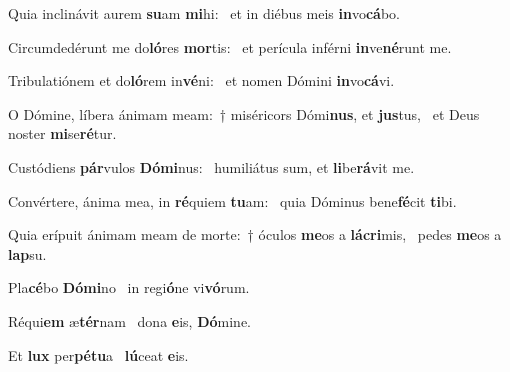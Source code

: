 \item Quia inclinávit aurem \textbf{su}am \textbf{mi}hi:~\psstar{} et in diébus meis \textbf{in}vo\textbf{cá}bo.

\item Circumdedérunt me do\textbf{ló}res \textbf{mor}tis:~\psstar{} et perícula inférni \textbf{in}ve\textbf{né}runt me.

\item Tribulatiónem et do\textbf{ló}rem in\textbf{vé}ni:~\psstar{} et nomen Dómini \textbf{in}vo\textbf{cá}vi.

\item O Dómine, líbera ánimam meam:~† miséricors Dómi\textbf{nus}, et \textbf{jus}tus,~\psstar{} et Deus noster \textbf{mi}se\textbf{ré}tur.

\item Custódiens \textbf{pár}vulos \textbf{Dó}\textbf{mi}nus:~\psstar{} humiliátus sum, et \textbf{li}be\textbf{rá}vit me.

\item Convértere, ánima mea, in \textbf{ré}quiem \textbf{tu}am:~\psstar{} quia Dóminus bene\textbf{fé}cit \textbf{ti}bi.

\item Quia erípuit ánimam meam de morte:~† óculos \textbf{me}os a \textbf{lá}\textbf{cri}mis,~\psstar{} pedes \textbf{me}os a \textbf{lap}su.

\item Pla\textbf{cé}bo \textbf{Dó}\textbf{mi}no~\psstar{} in regi\textbf{ó}ne vi\textbf{vó}rum.

\item Réqui\textbf{em} æ\textbf{tér}nam~\psstar{} dona \textbf{e}is, \textbf{Dó}mine.

\item Et \textbf{lux} per\textbf{pé}\textbf{tu}a~\psstar{} \textbf{lú}ceat \textbf{e}is.